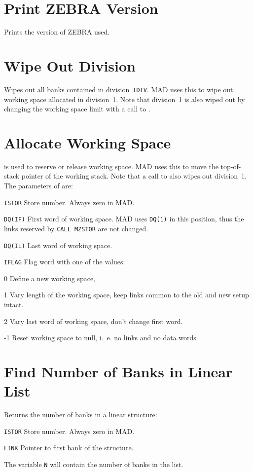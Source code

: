 \section{Print ZEBRA Version}
\label{MZVERS}
Prints the version of ZEBRA used.

\section{Wipe Out Division}
\label{MZWIPE}
Wipes out all banks contained in division~{\tt IDIV}.
MAD uses this to wipe out working space allocated in division~1.
Note that division~1 is also wiped out by changing the working space
limit with a call to .

\section{Allocate Working Space}
\label{MZWORK}
is used to reserve or release working space.
MAD uses this to move the top-of-stack pointer of the working stack.
Note that a call to  also wipes out division~1.
The parameters of  are:
\begin{mylist}
\item[\tt ISTOR]
    Store number. Always zero in MAD.
\item[\tt DQ(IF)]
    First word of working space.
    MAD uses {\tt DQ(1)} in this position,
    thus the links reserved by {\tt CALL MZSTOR} are not changed.
\item[\tt DQ(IL)]
    Last word of working space.
\item[\tt IFLAG]
    Flag word with one of the values:
    \begin{mylist}
    \item[0]
        Define a new working space,
    \item[1]
        Vary length of the working space, keep links common to the
        old and new setup intact.
    \item[2]
        Vary last word of working space, don't change first word.
    \item[-1]
        Reset working space to null, i.~e. no links and no data words.
    \end{mylist}
\end{mylist}

\section{Find Number of Banks in Linear List}
\label{NZBANK}
Returns the number of banks in a linear structure:
\begin{mylist}
\item[\tt ISTOR]
    Store number. Always zero in MAD.
\item[\tt LINK]
    Pointer to first bank of the structure.
\end{mylist}
The variable {\tt N} will contain the number of banks in the list.

